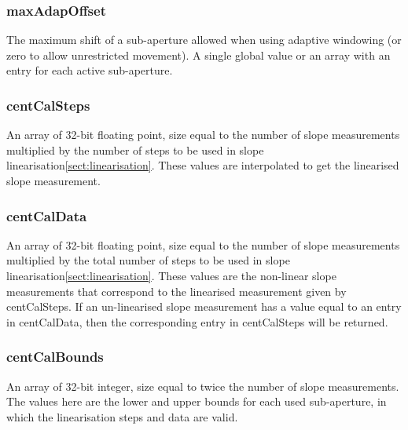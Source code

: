 \documentclass[a4,10pt]{article}
\begin{document}
\subsubsection{maxAdapOffset}
The maximum shift of a sub-aperture allowed when using adaptive
windowing (or zero to allow unrestricted movement).  A single global
value or an array with an entry for each active sub-aperture.



\subsubsection{centCalSteps}
An array of 32-bit floating point, size equal to the number of slope
measurements multiplied by the number of steps to be used in slope
linearisation\ref{sect:linearisation}.  These values are interpolated
to get the linearised slope measurement.

\subsubsection{centCalData}
An array of 32-bit floating point, size equal to the number of slope
measurements multiplied by the total number of steps to be used in
slope linearisation\ref{sect:linearisation}.  These values are the
non-linear slope measurements that correspond to the linearised
measurement given by centCalSteps.  If an un-linearised slope
measurement has a value equal to an entry in centCalData, then the
corresponding entry in centCalSteps will be returned.

\subsubsection{centCalBounds}
An array of 32-bit integer, size equal to twice the number of slope
measurements.  The values here are the lower and upper bounds for each
used sub-aperture, in which the linearisation steps and data are valid.
\end{document}
